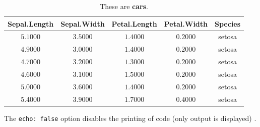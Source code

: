 \documentclass[
  authoryear]{elsarticle}
\begin{document}
\hypertarget{tbl-cars}{}
\begin{longtable}{ccccc}
\caption{\label{tbl-cars}These are \textbf{cars}. }\tabularnewline

\toprule
Sepal.Length & Sepal.Width & Petal.Length & Petal.Width & Species \\ 
\midrule
$5.1000$ & $3.5000$ & $1.4000$ & $0.2000$ & setosa \\ 
$4.9000$ & $3.0000$ & $1.4000$ & $0.2000$ & setosa \\ 
$4.7000$ & $3.2000$ & $1.3000$ & $0.2000$ & setosa \\ 
$4.6000$ & $3.1000$ & $1.5000$ & $0.2000$ & setosa \\ 
$5.0000$ & $3.6000$ & $1.4000$ & $0.2000$ & setosa \\ 
$5.4000$ & $3.9000$ & $1.7000$ & $0.4000$ & setosa \\ 
\bottomrule
\end{longtable}

The \texttt{echo:\ false} option disables the printing of code (only
output is displayed) \citep{abe2010}.


  
\end{document}
